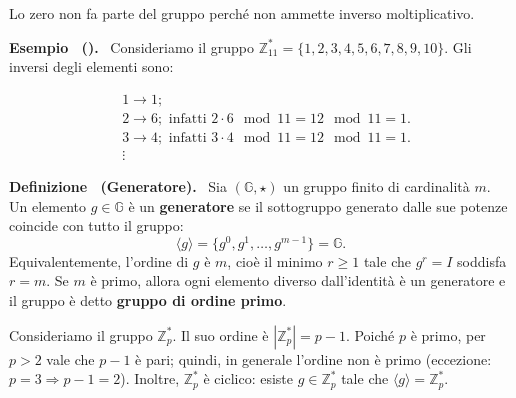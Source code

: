 \documentclass[a4paper, 11pt]{article}
\newenvironment{example}[1][]{
  \par\noindent\textbf{Esempio%
  \if\relax\detokenize{#1}\relax\else\ (\textbf{#1})\fi.}\ }{}
\newenvironment{definition}[1][]{
  \par\noindent\textbf{Definizione%
  \if\relax\detokenize{#1}\relax\else\ (\textbf{#1})\fi.}\ }{}
\begin{document}
Lo zero non fa parte del gruppo perché non ammette inverso moltiplicativo.

\begin{example}
    Consideriamo il gruppo $\mathbb{Z}_{11}^* = \{1, 2, 3, 4, 5, 6, 7, 8, 9, 10\}$.
    Gli inversi degli elementi sono:

    \begin{align*}
        & 1 \to 1; \\
        & 2 \to 6; \text{ infatti } 2 \cdot 6 \mod 11 = 12 \mod 11 = 1. \\
        & 3 \to 4; \text{ infatti } 3 \cdot 4 \mod 11 = 12 \mod 11 = 1. \\
        &\vdots
    \end{align*}
\end{example}

\begin{definition}[Generatore]
    Sia $(\mathbb{G}, \star)$ un gruppo finito di cardinalità $m$. Un elemento $g \in \mathbb{G}$ è un \textbf{generatore} se il sottogruppo generato dalle sue potenze coincide con tutto il gruppo:
    \[
        \langle g \rangle = \{g^0, g^1, \dots, g^{m-1}\} = \mathbb{G}.
    \]
    Equivalentemente, l'ordine di $g$ è $m$, cioè il minimo $r \ge 1$ tale che $g^r = I$ soddisfa $r = m$.
    Se $m$ è primo, allora ogni elemento diverso dall'identità è un generatore e il gruppo è detto \textbf{gruppo di ordine primo}.
\end{definition}

Consideriamo il gruppo $\mathbb{Z}_p^*$. Il suo ordine è $|\mathbb{Z}_p^*| = p-1$. Poiché $p$ è primo, per $p>2$ vale che $p-1$ è pari; quindi, in generale l'ordine non è primo (eccezione: $p=3 \Rightarrow p-1=2$). Inoltre, $\mathbb{Z}_p^*$ è ciclico: esiste $g\in\mathbb{Z}_p^*$ tale che $\langle g\rangle=\mathbb{Z}_p^*$.

\newpage
\end{document}
